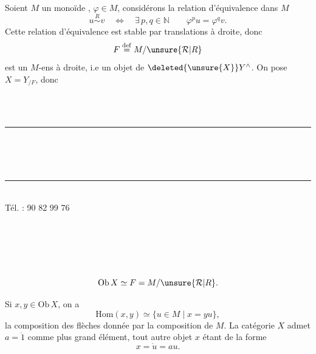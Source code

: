 Soient $M$ un monoïde ,  $\varphi\in M$, considérons la relation d'équivalence  dans $M$
\[
u\overset{R}{\sim}v\quad\Longleftrightarrow\quad\exists\,p,q\in\mathbb N\qquad\varphi^p u=\varphi^q v.
\]
Cette relation d'équivalence est stable par translations à droite, donc
\[
F\overset{\mathrm{def}}{=}M/\unsure{\mathcal R|R}
\]
est un $M$-ens à droite, i.e un objet de $\deleted{\unsure{X}}Y^\wedge$. On pose $X=Y_{/F}$, donc
\par\smallskip
{\footnotesize\noindent\begin{minipage}[t]{.46\linewidth}\raggedright
{}\\ \\ \rule{2.6em}{.3pt}\\ \\ \\ \rule{2.6em}{.3pt}\\ Tél. : 90 82 99 76\\ 
\end{minipage}\hfill%
\begin{minipage}[t]{.51\linewidth}\raggedright
{}\\ \\ \\ \\ 
\end{minipage}\par}


\[
\mathrm{Ob}\,X\simeq F=M/\unsure{\mathcal R|R}.
\]

Si $x,y\in\mathrm{Ob}\,X$, on a
\[
\mathrm{Hom}(x,y)\simeq\{u\in M\mid x=yu\},
\]
la composition des flèches  donnée par la composition de $M$. La catégorie $X$ admet $a=\dot 1$ comme plus grand élément, tout autre objet $x$ étant de la forme
\[
x=\dot u=au.
\]

